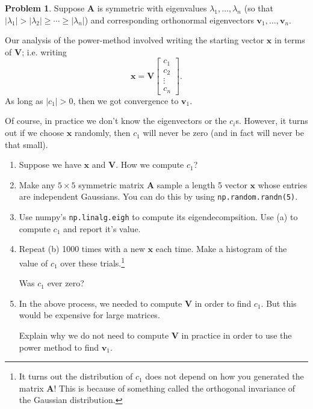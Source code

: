 \documentclass[12pt]{article}
\theoremstyle{definition}
\newtheorem{problem}{Problem}
\renewcommand{\vec}{\mathbf}
\begin{document}
\begin{problem}

    Suppose $\vec{A}$ is symmetric with eigenvalues $\lambda_1, \ldots, \lambda_n$ (so that $|\lambda_1| > |\lambda_2|  \geq \cdots \geq |\lambda_n|$) and corresponding orthonormal eigenvectors $\vec{v}_1, \ldots, \vec{v}_n$.

    Our analysis of the power-method involved writing the starting vector $\vec{x}$ in terms of $\vec{V}$; i.e. writing 
    \[
    \vec{x} = \vec{V} \begin{bmatrix}
        c_1 \\ c_2 \\ \vdots \\ c_n
    \end{bmatrix}.
    \]
    As long as $|c_1| > 0$, then we got convergence to $\vec{v}_1$.

    Of course, in practice we don't know the eigenvectors or the $c_i$s. 
    However, it turns out if we choose $\vec{x}$ randomly, then $c_1$ will never be zero (and in fact will never be that small).

    \begin{enumerate}
        \item Suppose we have $\vec{x}$ and $\vec{V}$. 
        How we compute $c_1$?
        
        \item Make any $5\times 5$ symmetric matrix $\vec{A}$ sample a length 5 vector $\vec{x}$ whose entries are independent Gaussians. You can do this by using \texttt{np.random.randn(5)}.
        
        \item Use numpy's \texttt{np.linalg.eigh} to compute its eigendecompsition. Use (a) to compute $c_1$ and report it's value.
        
        \item Repeat (b) 1000 times with a new $\vec{x}$ each time. 
        Make a histogram of the value of $c_1$ over these trials.\footnote{It turns out the distribution of $c_1$ does not depend on how you generated the matrix $\vec{A}$! This is because of something called the orthogonal invariance of the Gaussian distribution.}
 
        Was $c_1$ ever zero? 
        \item In the above process, we needed to compute $\vec{V}$ in order to find $c_1$. But this would be expensive for large matrices.
        
        Explain why we do not need to compute $\vec{V}$ in practice in order to use the power method to find $\vec{v}_1$. 
        
    \end{enumerate}


\end{problem}
\end{document}
